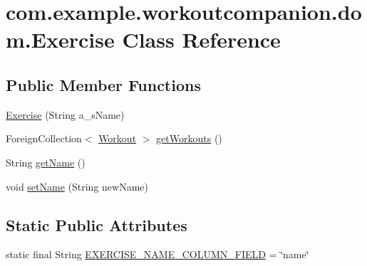 \hypertarget{classcom_1_1example_1_1workoutcompanion_1_1dom_1_1_exercise}{\section{com.\-example.\-workoutcompanion.\-dom.\-Exercise Class Reference}
\label{classcom_1_1example_1_1workoutcompanion_1_1dom_1_1_exercise}
}
\subsection*{Public Member Functions}
\begin{DoxyCompactItemize}
\item 
\hyperlink{classcom_1_1example_1_1workoutcompanion_1_1dom_1_1_exercise_a37072c8ae939cf4c97c09a6158eeafa6}{Exercise} (String a\-\_\-s\-Name)
\item 
Foreign\-Collection$<$ \hyperlink{classcom_1_1example_1_1workoutcompanion_1_1dom_1_1_workout}{Workout} $>$ \hyperlink{classcom_1_1example_1_1workoutcompanion_1_1dom_1_1_exercise_a7094714bc04027326cc8df11f3ca9386}{get\-Workouts} ()
\item 
String \hyperlink{classcom_1_1example_1_1workoutcompanion_1_1dom_1_1_exercise_aa3aa2d96310db78e6c78816929a80a9f}{get\-Name} ()
\item 
void \hyperlink{classcom_1_1example_1_1workoutcompanion_1_1dom_1_1_exercise_a3e169898ed772f62d20c2d2899c30eb6}{set\-Name} (String new\-Name)
\end{DoxyCompactItemize}
\subsection*{Static Public Attributes}
\begin{DoxyCompactItemize}
\item 
static final String \hyperlink{classcom_1_1example_1_1workoutcompanion_1_1dom_1_1_exercise_a1aeb9a6e42c38c3169197b37e8ee79f8}{E\-X\-E\-R\-C\-I\-S\-E\-\_\-\-N\-A\-M\-E\-\_\-\-C\-O\-L\-U\-M\-N\-\_\-\-F\-I\-E\-L\-D} = \char`\"{}name\char`\"{}
\end{DoxyCompactItemize}


